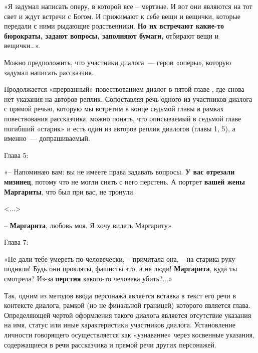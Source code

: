 \documentclass{kursa4}
\begin{document}
    {\color[rgb]{0.2,0.2,0.2}
    «Я задумал написать оперу, в которой все – мертвые. И вот они
    являются на тот свет и ждут встречи с Богом. И прижимают к себе вещи и
    вещички, которые передали с ними рыдающие родственники. \textbf{Но их
    встречают какие-то бюрократы, задают вопросы, заполняют бумаги,}
    отбирают вещи и вещички…».}

    {\color[rgb]{0.2,0.2,0.2}
    Можно предположить, что участники диалога~--- герои «оперы», которую
    задумал написать рассказчик. }

    {\color[rgb]{0.2,0.2,0.2}
    Продолжается «прерванный» повествованием диалог в пятой главе , где
    снова нет указания на авторов реплик. Сопоставляя речь одного из
    участников диалога с прямой речью, которую мы встретим в конце седьмой
    главы в рамках повествования рассказчика, можно понять, что описываемый
    в седьмой главе погибший «старик» и есть один из авторов реплик
    диалогов (главы 1, 5), а именно~--- допрашиваемый. }

    {\color[rgb]{0.2,0.2,0.2}
    Глава 5:}

    {\color[rgb]{0.2,0.2,0.2}
    «– Напоминаю вам: вы не имеете права задавать вопросы. \textbf{У вас
    отрезали мизинец}, потому что не могли снять с него перстень. А портрет
    \textbf{вашей жены }\textbf{Маргариты}, что был при вас, не тронули.}

    {\color[rgb]{0.2,0.2,0.2}
    \textless{}...\textgreater{}}

    {\color[rgb]{0.2,0.2,0.2}
    – \textbf{Маргарита}, любовь моя. Я хочу видеть Маргариту».}

    {\color[rgb]{0.2,0.2,0.2}
    Глава 7:}

    {\color[rgb]{0.2,0.2,0.2}
    «Не дали тебе умереть по-человечески, – причитала она, – на старика
    руку подняли! Будь они прокляты, фашисты это, а не люди!
    \textbf{Маргарита}, куда ты смотрела? Из-за \textbf{перстня} какого-то
    человека убить?...»}

    {\color[rgb]{0.2,0.2,0.2}
    Так, одним из методов ввода персонажа является вставка в текст его
    речи в контексте диалога, рамкой (но не финальной границей) которого
    является глава. Определяющей чертой оформления такого диалога является
    отсутствие указания на имя, статус или иные характеристики участников
    диалога. Установление личности говорящего осуществляется как
    «узнавание» через косвенные указания, содержащиеся в речи рассказчика
    и прямой речи других персонажей. }
\end{document}
